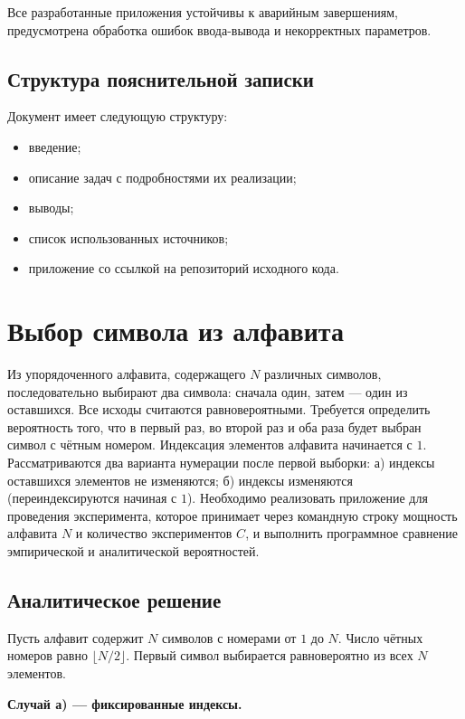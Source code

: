 \documentclass[14pt,a4paper]{extarticle}
\begin{document}
Все разработанные приложения устойчивы к аварийным завершениям, предусмотрена обработка ошибок ввода-вывода и некорректных параметров.


\subsection{Структура пояснительной записки}

Документ имеет следующую структуру:

\begin{itemize}
  \item введение;
  \item описание задач с подробностями их реализации;
  \item выводы;
  \item список использованных источников;
  \item приложение со ссылкой на репозиторий исходного кода.
\end{itemize}

\clearpage

\section{Выбор символа из алфавита}

Из упорядоченного алфавита, содержащего $N$ различных символов, последовательно
выбирают два символа: сначала один, затем — один из оставшихся. Все исходы считаются
равновероятными. Требуется определить вероятность того, что в первый раз, во второй раз
и оба раза будет выбран символ с чётным номером. Индексация элементов алфавита начинается
с $1$. Рассматриваются два варианта нумерации после первой выборки:
а) индексы оставшихся элементов не изменяются;
б) индексы изменяются (переиндексируются начиная с $1$).
Необходимо реализовать приложение для проведения эксперимента, которое принимает через
командную строку мощность алфавита $N$ и количество экспериментов $C$, и выполнить
программное сравнение эмпирической и аналитической вероятностей.


\subsection{Аналитическое решение}

Пусть алфавит содержит $N$ символов с номерами от $1$ до $N$. Число чётных номеров равно
$\lfloor N/2 \rfloor$. Первый символ выбирается равновероятно из всех $N$ элементов.


\textbf{Случай а) — фиксированные индексы.}
\end{document}

